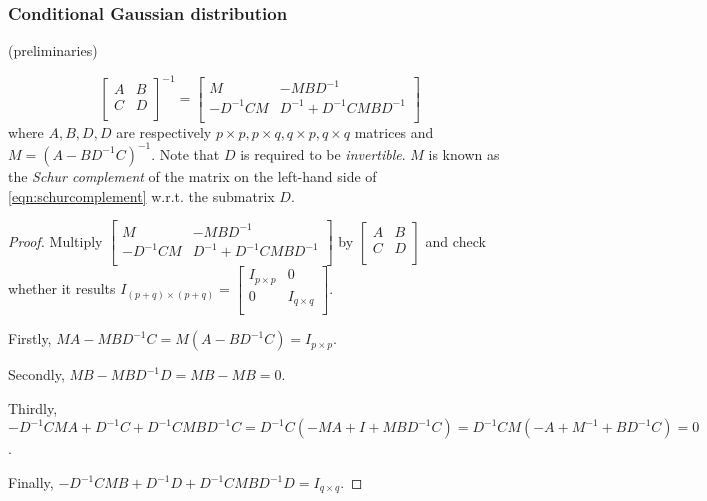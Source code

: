 \subsubsection{Conditional Gaussian distribution}
(preliminaries)
\begin{conclusion}
\begin{equation}
\begin{bmatrix}A&B\\C&D\\\end{bmatrix}^{-1}=\begin{bmatrix}M&-MBD^{-1}\\-D^{-1}CM&D^{-1}+D^{-1}CMBD^{-1}\\\end{bmatrix}
\label{eqn:schurcomplement}
\end{equation}
where $A,B,D,D$ are respectively
$p\times{}p,p\times{}q,q\times{}p,q\times{}q$ matrices and
$M=(A-BD^{-1}C)^{-1}$. Note that $D$ is required to be
\emph{invertible}. $M$ is known as the \emph{Schur complement} of the
matrix on the left-hand side of \eqref{eqn:schurcomplement} w.r.t. the
submatrix $D$.
\end{conclusion}
\begin{proof}
Multiply
$\begin{bmatrix}M&-MBD^{-1}\\-D^{-1}CM&D^{-1}+D^{-1}CMBD^{-1}\\\end{bmatrix}$
by $\begin{bmatrix}A&B\\C&D\\\end{bmatrix}$ and check whether it
results
$I_{(p+q)\times{}(p+q)}=\begin{bmatrix}I_{p\times{}p}&0\\0&I_{q\times{}q}\\\end{bmatrix}$.


Firstly, $MA-MBD^{-1}C=M(A-BD^{-1}C)=I_{p\times{}p}$.


Secondly, $MB-MBD^{-1}D=MB-MB=0$.


Thirdly,
    $-D^{-1}CMA+D^{-1}C+D^{-1}CMBD^{-1}C=D^{-1}C(-MA+I+MBD^{-1}C)=D^{-1}CM(-A+M^{-1}+BD^{-1}C)=0$.


Finally, $-D^{-1}CMB+D^{-1}D+D^{-1}CMBD^{-1}D=I_{q\times{}q}$.
\end{proof}


